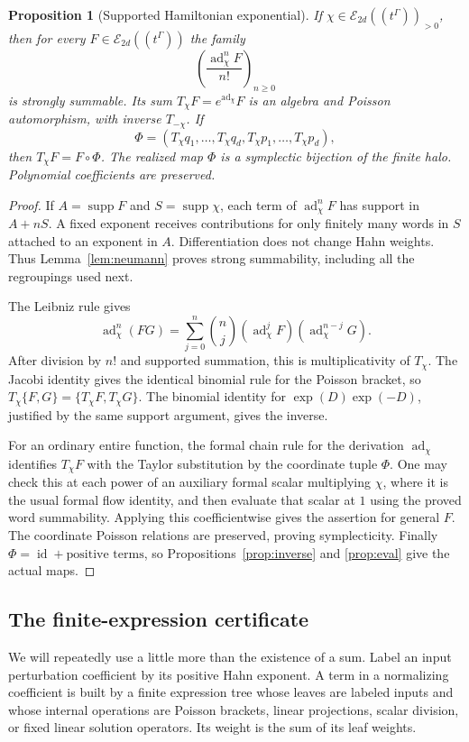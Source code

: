 \documentclass[11pt,letterpaper]{article}
\numberwithin{equation}{section}
\newtheorem{proposition}[theorem]{Proposition}
\theoremstyle{definition}
\theoremstyle{remark}
\newcommand{\E}{\mathscr E}
\newcommand{\supp}{\operatorname{supp}}
\newcommand{\ad}{\operatorname{ad}}
\newcommand{\id}{\operatorname{id}}
\newcommand{\HH}[1]{#1((t^\Gamma))}
\begin{document}
\begin{proposition}[Supported Hamiltonian exponential]\label{prop:exp}
If $\chi\in\HH{\E_{2d}}_{>0}$, then for every
$F\in\HH{\E_{2d}}$ the family
\[
 \left(\frac{\ad_\chi^nF}{n!}\right)_{n\ge0}
\]
is strongly summable. Its sum $T_\chi F=e^{\ad_\chi}F$ is an algebra and
Poisson automorphism, with inverse $T_{-\chi}$. If
\[
 \Phi=(T_\chi q_1,\ldots,T_\chi q_d,
             T_\chi p_1,\ldots,T_\chi p_d),
\]
then $T_\chi F=F\circ\Phi$. The realized map $\Phi$ is a symplectic
bijection of the finite halo. Polynomial coefficients are preserved.
\end{proposition}
\begin{proof}
If $A=\supp F$ and $S=\supp\chi$, each term of $\ad_\chi^nF$ has support
in $A+nS$. A fixed exponent receives contributions for only finitely many
words in $S$ attached to an exponent in $A$. Differentiation does not change
Hahn weights. Thus Lemma~\ref{lem:neumann} proves strong summability,
including all the regroupings used next.

The Leibniz rule gives
\[
 \ad_\chi^n(FG)=\sum_{j=0}^n\binom nj
       (\ad_\chi^jF)(\ad_\chi^{n-j}G).
\]
After division by $n!$ and supported summation, this is multiplicativity of
$T_\chi$. The Jacobi identity gives the identical binomial rule for the
Poisson bracket, so $T_\chi\{F,G\}=\{T_\chi F,T_\chi G\}$.
The binomial identity for $\exp(D)\exp(-D)$, justified by the same support
argument, gives the inverse.

For an ordinary entire function, the formal chain rule for the derivation
$\ad_\chi$ identifies $T_\chi F$ with the Taylor substitution by the
coordinate tuple $\Phi$. One may check this at each power of an auxiliary
formal scalar multiplying $\chi$, where it is the usual formal flow
identity, and then evaluate that scalar at $1$ using the proved word
summability. Applying this coefficientwise gives the assertion for general
$F$. The coordinate Poisson relations are preserved, proving
symplecticity. Finally $\Phi=\id+\text{positive terms}$, so
Propositions~\ref{prop:inverse} and \ref{prop:eval} give the actual maps.
\end{proof}

\subsection{The finite-expression certificate}
We will repeatedly use a little more than the existence of a sum. Label an
input perturbation coefficient by its positive Hahn exponent. A term in a
normalizing coefficient is built by a finite expression tree whose leaves
are labeled inputs and whose internal operations are Poisson brackets,
linear projections, scalar division, or fixed linear solution operators.
Its weight is the sum of its leaf weights.
\end{document}
